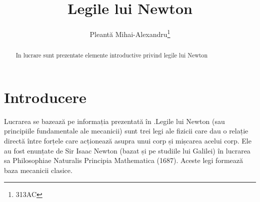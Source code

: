 \documentclass{article}
\title{Legile lui Newton}
\author{Pleantă Mihai-Alexandru\footnote{313AC}}
\date{}
\begin{document}
\maketitle
\begin{abstract}
In lucrare sunt prezentate elemente introductive privind legile lui Newton
\end{abstract}
%
\section{Introducere}\label{intro}
Lucrarea se bazează pe informația prezentată în \cite{wiki}.Legile lui Newton (sau principiile fundamentale ale mecanicii) sunt trei legi ale fizicii care dau o relație directă între forțele care acționează asupra unui corp și mișcarea acelui corp. Ele au fost enunțate de Sir Isaac Newton (bazat și pe studiile lui Galilei) în lucrarea sa Philosophiae Naturalis Principia Mathematica (1687). Aceste legi formează baza mecanicii clasice.
\end{document}
